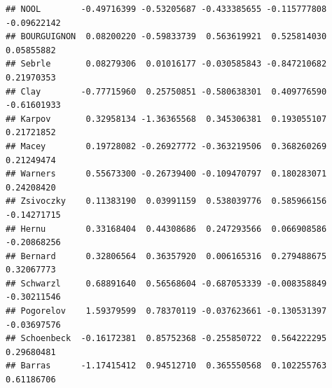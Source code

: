\documentclass[
]{book}
\newenvironment{Shaded}{\begin{snugshade}}{\end{snugshade}}
\newcommand{\NormalTok}[1]{#1}
\newcommand{\SpecialCharTok}[1]{\textcolor[rgb]{0.81,0.36,0.00}{\textbf{#1}}}
\begin{document}
\begin{verbatim}
## NOOL        -0.49716399 -0.53205687 -0.433385655 -0.115777808 -0.09622142
## BOURGUIGNON  0.08200220 -0.59833739  0.563619921  0.525814030  0.05855882
## Sebrle       0.08279306  0.01016177 -0.030585843 -0.847210682  0.21970353
## Clay        -0.77715960  0.25750851 -0.580638301  0.409776590 -0.61601933
## Karpov       0.32958134 -1.36365568  0.345306381  0.193055107  0.21721852
## Macey        0.19728082 -0.26927772 -0.363219506  0.368260269  0.21249474
## Warners      0.55673300 -0.26739400 -0.109470797  0.180283071  0.24208420
## Zsivoczky    0.11383190  0.03991159  0.538039776  0.585966156 -0.14271715
## Hernu        0.33168404  0.44308686  0.247293566  0.066908586 -0.20868256
## Bernard      0.32806564  0.36357920  0.006165316  0.279488675  0.32067773
## Schwarzl     0.68891640  0.56568604 -0.687053339 -0.008358849 -0.30211546
## Pogorelov    1.59379599  0.78370119 -0.037623661 -0.130531397 -0.03697576
## Schoenbeck  -0.16172381  0.85752368 -0.255850722  0.564222295  0.29680481
## Barras      -1.17415412  0.94512710  0.365550568  0.102255763  0.61186706
\end{verbatim}

\begin{Shaded}
\end{Shaded}
\end{document}
